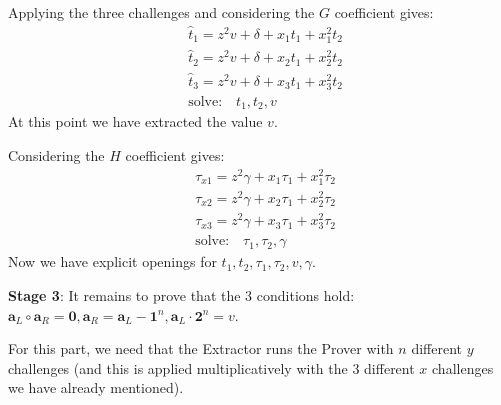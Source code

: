 \documentclass[10pt,a4paper]{article}
\begin{document}
Applying the three challenges and considering the $G$ coefficient gives:
\begin{align*}
& \hat{t}_1 = z^2v + \delta + x_1t_1 + x_1^2t_2 \\
& \hat{t}_2 = z^2v + \delta + x_2t_1 + x_2^2t_2 \\
& \hat{t}_3 = z^2v + \delta + x_3t_1 + x_3^2t_2 \\
& \textrm{solve:} \quad t_1, t_2, v
\end{align*}
At this point we have extracted the value $v$.

Considering the $H$ coefficient gives:
\begin{align*}
& \tau_{x1} = z^2\gamma + x_1 \tau_1 + x_1^2 \tau_2 \\
& \tau_{x2} = z^2\gamma + x_2 \tau_1 + x_2^2 \tau_2 \\
& \tau_{x3} = z^2\gamma + x_3 \tau_1 + x_3^2 \tau_2 \\
& \textrm{solve:}\quad \tau_1, \tau_2, \gamma
\end{align*}
Now we have explicit openings for $t_1, t_2, \tau_1, \tau_2, v, \gamma$.

\textbf{Stage 3}: It remains to prove that the 3 conditions hold: $\textbf{a}_L \circ \textbf{a}_R = \textbf{0}, \textbf{a}_R = \textbf{a}_L - \textbf{1}^n, \textbf{a}_L \cdot \textbf{2}^n = v$.

For this part, we need that the Extractor runs the Prover with $n$ different $y$
challenges (and this is applied multiplicatively with the 3 different $x$ 
challenges we have already mentioned).
\end{document}
